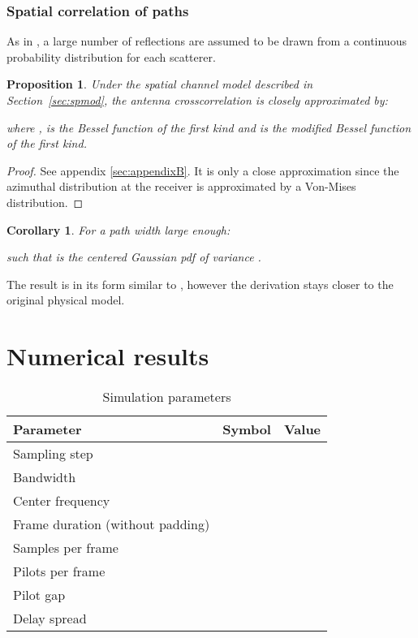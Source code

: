 \documentclass[journal,10pt]{IEEEtran}
\renewcommand{\arraystretch}{1.2}
\newcommand{\ra}[1]{\renewcommand{\arraystretch}{#1}}
\newtheorem{proposition}{Proposition}
\newtheorem{corollary}{Corollary}
\begin{document}
\subsubsection{Spatial correlation of paths}
As in \cite{Salz1994}, a large number of reflections are assumed to be drawn from a continuous probability distribution for each scatterer. 
\begin{proposition}\label{prop:spacecorr}
Under the spatial channel model described in Section~\ref{sec:spmod}, the antenna crosscorrelation is closely approximated by:

where ,  is the Bessel function of the first kind and  is the modified Bessel function of the first kind.
\end{proposition}
\begin{proof}
See appendix \ref{sec:appendixB}. It is only a close approximation since the azimuthal distribution at the receiver is approximated by a Von-Mises distribution.
\end{proof}
\begin{corollary}
For a path width  large enough:

such that  is the centered Gaussian pdf of variance .
\end{corollary}
The result is in its form similar to \cite{Salz1994}, however the derivation stays closer to the original physical model. 

\section{Numerical results}
\begin{table}[t]\centering \ra{1.3}\caption{Simulation parameters}
\begin{tabular}{@{}lcl@{}}\toprule
\textbf{Parameter}& \textbf{Symbol}& \textbf{Value}\\\midrule
 Sampling step &&\\ 
 Bandwidth & & \\
 Center frequency &  & \\ 
 Frame duration (without padding)& & \\
 Samples per frame && \\
 Pilots per frame &&\\
 Pilot gap &&\\
 Delay spread &  & \\\bottomrule
\end{tabular}
 \label{tabl:rxspec}
\end{table}
\end{document}
